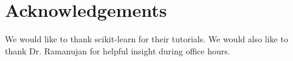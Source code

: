 
\section{Acknowledgements} 
\label{sec:ack} 

We would like to thank scikit-learn for their tutorials. 
We would also like to thank Dr. Ramanujan for helpful insight during office hours.
